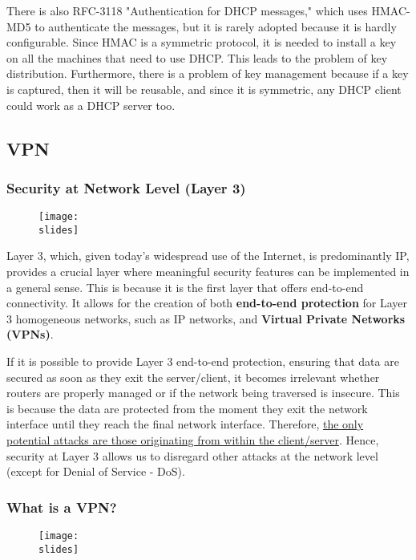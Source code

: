 There is also RFC-3118 "Authentication for DHCP messages," which uses HMAC-MD5 to authenticate the messages, but it is rarely adopted because it is hardly configurable. Since HMAC is a symmetric protocol, it is needed to install a key on all the machines that need to use DHCP. This leads to the problem of key distribution. Furthermore, there is a problem of key management because if a key is captured, then it will be reusable, and since it is symmetric, any DHCP client could work as a DHCP server too.


\subsection{VPN}
\subsubsection{Security at Network Level (Layer 3)}

\begin{figure}[h]
    \centering
    \texttt{[image: \\slides]}
\end{figure}

Layer 3, which, given today's widespread use of the Internet, is predominantly IP, provides a crucial layer where meaningful security features can be implemented in a general sense. This is because it is the first layer that offers end-to-end connectivity. It allows for the creation of both \textbf{end-to-end protection} for Layer 3 homogeneous networks, such as IP networks, and \textbf{Virtual Private Networks (VPNs)}.

If it is possible to provide Layer 3 end-to-end protection, ensuring that data are secured as soon as they exit the server/client, it becomes irrelevant whether routers are properly managed or if the network being traversed is insecure. This is because the data are protected from the moment they exit the network interface until they reach the final network interface. Therefore, \ul{the only potential attacks are those originating from within the client/server}. Hence, security at Layer 3 allows us to disregard other attacks at the network level (except for Denial of Service - DoS).


\subsubsection{What is a VPN?}

\begin{figure}[h]
    \centering
    \texttt{[image: \\slides]}
\end{figure}


